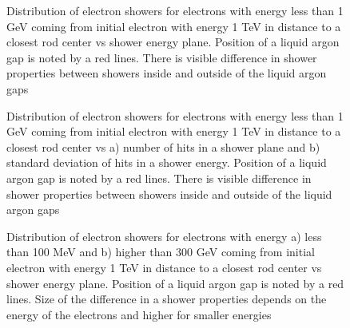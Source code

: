 \begin{figure}[!tbp]
\caption{Distribution of electron showers for electrons with energy less than 1 GeV coming from initial electron with energy 1 TeV in distance to a closest rod center vs shower energy plane. Position of a liquid argon gap is noted by a red lines. There is visible difference in shower properties between showers inside and outside of the liquid argon gaps}
\label{fig:FSProduction}
\end{figure}

\begin{figure}[!tbp]
\begin{minipage}[h]{0.49\linewidth}
\end{minipage}
\hfill
\begin{minipage}[h]{0.49\linewidth}
\end{minipage}
\caption{Distribution of electron showers for electrons with energy less than 1 GeV coming from initial electron with energy 1 TeV in distance to a closest rod center vs a) number of hits in a shower plane and b) standard deviation of hits in a shower energy. Position of a liquid argon gap is noted by a red lines. There is visible difference in shower properties between showers inside and outside of the liquid argon gaps}
\label{fig:ShowerProp}
\end{figure}

\begin{figure}[!tbp]
\begin{minipage}[h]{0.49\linewidth}
\end{minipage}
\hfill
\begin{minipage}[h]{0.49\linewidth}
\end{minipage}
\caption{Distribution of electron showers for electrons with energy a) less than 100 MeV  and b) higher than 300 GeV coming from initial electron with energy 1 TeV in distance to a closest rod center vs shower energy plane. Position of a liquid argon gap is noted by a red lines. Size of the difference in a shower properties depends on the energy of the electrons and higher for smaller energies}
\label{fig:FSProduction2}
\end{figure}

